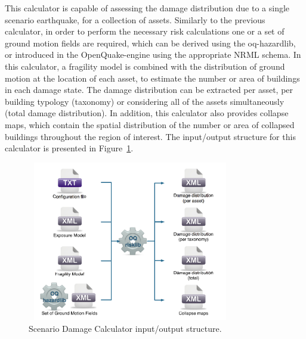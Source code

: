 This calculator is capable of assessing the damage distribution due to a
single scenario earthquake, for a collection of assets. Similarly to the
previous calculator, in order to perform the necessary risk calculations one
or a set of ground motion fields are required, which can be derived using the
oq-hazardlib, or introduced in the OpenQuake-engine using the appropriate NRML
schema. In this calculator, a fragility model is combined with the
distribution of ground motion at the location of each asset, to estimate the
number or area of buildings in each damage state. The damage distribution can
be extracted per asset, per building typology (taxonomy) or considering all of
the assets simultaneously (total damage distribution). In addition, this
calculator also provides collapse maps, which contain the spatial distribution
of the number or area of collapsed buildings throughout the region of
interest. The input/output structure for this calculator is presented in
Figure~\ref{fig:io-structure-scenario-damage}.

\begin{figure}[ht]
\centering
\includegraphics[width=9cm,height=7cm]{figures/risk/io-structure-scenario-damage.pdf}
\caption{Scenario Damage Calculator input/output structure.}
\label{fig:io-structure-scenario-damage}
\end{figure}